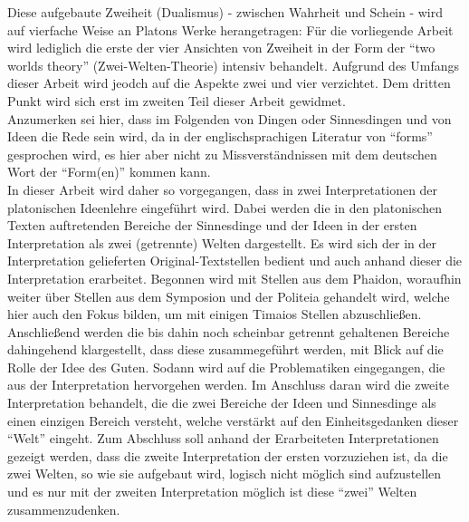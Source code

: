 Diese aufgebaute Zweiheit (Dualismus) - zwischen Wahrheit und Schein - wird auf vierfache Weise an Platons Werke herangetragen:
Für die vorliegende Arbeit wird lediglich die erste der vier Ansichten von Zweiheit in der Form der \enquote{two worlds theory} (Zwei-Welten-Theorie) intensiv behandelt. 
Aufgrund des Umfangs dieser Arbeit wird jeodch auf die Aspekte zwei und vier verzichtet. Dem dritten Punkt wird sich erst im zweiten Teil dieser Arbeit gewidmet.\\
Anzumerken sei hier, dass im Folgenden von Dingen oder Sinnesdingen und von Ideen die Rede sein wird, da in der englischsprachigen Literatur von \enquote{forms} gesprochen wird, es hier aber nicht zu Missverständnissen mit dem deutschen Wort der \enquote{Form(en)} kommen kann.\\
In dieser Arbeit wird daher so vorgegangen, dass in zwei Interpretationen der platonischen Ideenlehre eingeführt wird. Dabei werden die in den platonischen Texten auftretenden Bereiche der Sinnesdinge und der Ideen in der ersten Interpretation als zwei (getrennte) Welten dargestellt. Es wird sich der in der Interpretation gelieferten Original-Textstellen bedient und auch anhand dieser die Interpretation erarbeitet. Begonnen wird mit Stellen aus dem Phaidon, woraufhin weiter über Stellen aus dem Symposion und der Politeia gehandelt wird, welche hier auch den Fokus bilden, um mit einigen Timaios Stellen abzuschließen. Anschließend werden die bis dahin noch scheinbar getrennt gehaltenen Bereiche dahingehend klargestellt, dass diese zusammegeführt werden, mit Blick auf die Rolle der Idee des Guten. Sodann wird auf die Problematiken eingegangen, die aus der Interpretation hervorgehen werden. Im Anschluss daran wird die zweite Interpretation behandelt, die die zwei Bereiche der Ideen und Sinnesdinge als einen einzigen Bereich versteht, welche verstärkt auf den Einheitsgedanken dieser \enquote{Welt} eingeht. Zum Abschluss soll anhand der Erarbeiteten Interpretationen gezeigt werden, dass die zweite Interpretation der ersten vorzuziehen ist, da die zwei Welten, so wie sie aufgebaut wird, logisch nicht möglich sind aufzustellen und es nur mit der zweiten Interpretation möglich ist diese \enquote{zwei} Welten zusammenzudenken.\\

